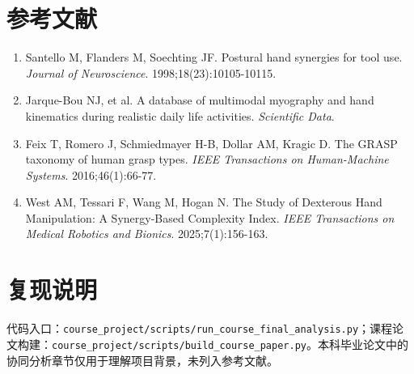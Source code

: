 \documentclass[10pt,a4paper]{ctexart}
\begin{document}
\section{参考文献}
\begin{enumerate}\setlength\itemsep{2pt}
\item Santello M, Flanders M, Soechting JF. Postural hand synergies for tool use. \emph{Journal of Neuroscience}. 1998;18(23):10105-10115.
\item Jarque-Bou NJ, et al. A database of multimodal myography and hand kinematics during realistic daily life activities. \emph{Scientific Data}.
\item Feix T, Romero J, Schmiedmayer H-B, Dollar AM, Kragic D. The GRASP taxonomy of human grasp types. \emph{IEEE Transactions on Human-Machine Systems}. 2016;46(1):66-77.
\item West AM, Tessari F, Wang M, Hogan N. The Study of Dexterous Hand Manipulation: A Synergy-Based Complexity Index. \emph{IEEE Transactions on Medical Robotics and Bionics}. 2025;7(1):156-163.
\end{enumerate}

\section*{复现说明}
代码入口：\texttt{course\_project/scripts/run\_course\_final\_analysis.py}；课程论文构建：\texttt{course\_project/scripts/build\_course\_paper.py}。本科毕业论文中的协同分析章节仅用于理解项目背景，未列入参考文献。
\end{document}
